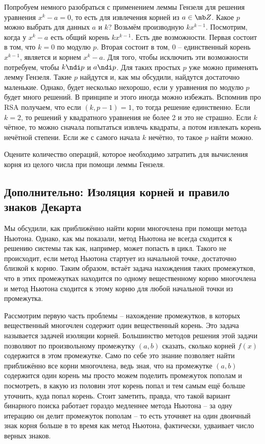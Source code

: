 Попробуем немного разобраться с применением леммы Гензеля для  решения уравнения $x^k-a=0$, то есть для извлечения корней из $a \in \mb Z$. Какое  $p$ можно выбрать для данных $a$ и $k$?  
Возьмём производную $kx^{k-1}$. Посмотрим, когда у $x^k-a$ есть общий корень $kx^{k-1}$. Есть две возможности. Первая состоит в том, что $k=0$ по модулю $p$. Вторая состоит в том, $0$ -- единственный корень $x^{k-1}$, является и корнем $x^k-a$.  Для того, чтобы исключить эти возможности потребуем, чтобы $k\ndi p$ и $a\ndi p$. Для таких простых $p$ уже можно применять лемму Гензеля. Такие $p$ найдутся и, как мы обсудили, найдутся достаточно маленькие.  Однако, будет несколько нехорошо, если у уравнения по модулю $p$ будет много решений. В принципе и этого иногда можно избежать. Вспомнив про RSA  получаем, что если $(k,p-1)=1$, то тогда решение единственно. Если $k=2$, то решений у квадратного уравнения не более 2 и это не страшно. Если $k$ чётное, то можно сначала попытаться извлечь квадраты, а потом извлекать корень нечётной степени. Если же с самого начала $k$ нечётно, то такое $p$ найти можно.

\upr Оцените количество операций, которое необходимо затратить для вычисления корня из целого числа при помощи леммы Гензеля.
\eupr



\subsection{Дополнительно: Изоляция корней и правило знаков Декарта}

Мы обсудили, как приближённо найти корни многочлена при помощи метода Ньютона. Однако, как мы показали, метод Ньютона не всегда сходится к решению системы так как, например, может попасть в цикл. Такого не происходит, если метод Ньютона стартует из начальной точке, достаточно близкой к корню. Таким образом, встаёт задача нахождения таких промежутков, что в этих промежутках находится по одному вещественному корню многочлена и метод Ньютона сходится к этому корню для любой начальной точки из промежутка.

Рассмотрим первую часть проблемы -- нахождение промежутков, в которых вещественный многочлен содержит один вещественный корень. Это задача называется задачей изоляции корней. Большинство методов решения этой задачи позволяют по произвольному промежутку $(a,b)$ сказать, сколько корней $f(x)$ содержится в этом промежутке. Само по себе это знание позволяет найти приближённо все корни многочлена, ведь зная, что на промежутке $(a,b)$ содержится один корень мы просто можем поделить промежуток пополам и посмотреть, в какую из половин этот корень попал и тем самым ещё больше уточнить, куда попал корень. Стоит заметить, правда, что такой вариант бинарного поиска работает гораздо медленнее метода Ньютона -- за одну итерацию он делит промежуток пополам -- то есть уточняет на один двоичный знак корня больше в то время как метод Ньютона, фактически, удваивает число верных знаков.

